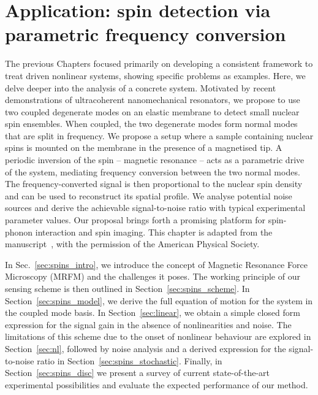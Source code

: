 
\chapter{Application: spin detection via parametric frequency conversion} \label{ch:spins}

\begin{chapterabstract}
	The previous Chapters focused primarily on developing a consistent framework to treat driven nonlinear systems, showing specific problems as examples. Here, we delve deeper into the analysis of a concrete system. Motivated by recent demonstrations of ultracoherent nanomechanical resonators, we propose to use two coupled degenerate modes on an elastic membrane to detect small nuclear spin ensembles. When coupled, the two degenerate modes form normal modes that are split in frequency. We propose a setup where a sample containing nuclear spins is mounted on the membrane in the presence of a magnetised tip. A periodic inversion of the spin -- magnetic resonance -- acts as a parametric drive of the system, mediating frequency conversion between the two normal modes. The frequency-converted signal is then proportional to the nuclear spin density and can be used to reconstruct its spatial profile. We analyse potential noise sources and derive the achievable signal-to-noise ratio with typical experimental parameter values. Our proposal brings forth a promising platform for spin-phonon interaction and spin imaging.
	\tcblower
	This chapter is adapted from the manuscript~\cite{Kosata_2020}, with the permission of the American Physical Society.
\end{chapterabstract}

In Sec.~\ref{sec:spins_intro}, we introduce the concept of Magnetic Resonance Force Microscopy (MRFM) and the challenges it poses. 
The working principle of our sensing scheme is then outlined in Section~\ref{sec:spins_scheme}. In Section~\ref{sec:spins_model}, we derive the full equation of motion for the system in the coupled mode basis. In Section~\ref{sec:linear}, we obtain a simple closed form expression for the signal gain in the absence of nonlinearities and noise. The limitations of this scheme due to the onset of nonlinear behaviour are explored in Section~\ref{sec:nl}, followed by noise analysis and a derived expression for the signal-to-noise ratio in Section~\ref{sec:spins_stochastic}. Finally, in Section~\ref{sec:spins_disc} we present a survey of current state-of-the-art experimental possibilities and evaluate the expected performance of our method. 


